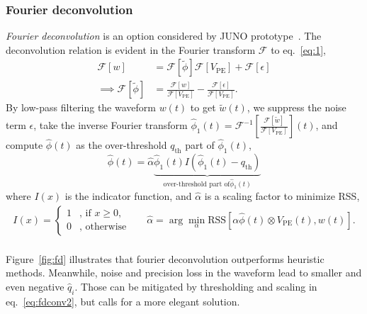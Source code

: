 \subsubsection{Fourier deconvolution}
\textit{Fourier deconvolution} is an option considered by JUNO prototype~\cite{zhang_comparison_2019}. The deconvolution relation is evident in the Fourier transform $\mathcal{F}$ to eq.~\eqref{eq:1},
\begin{equation}
  \label{eq:fourier}
  \begin{aligned}
  \mathcal{F}[w] & = \mathcal{F}[\tilde{\phi}]\mathcal{F}[V_\mathrm{PE}] + \mathcal{F}[\epsilon]\\
  \implies \mathcal{F}[\tilde{\phi}] & = \frac{\mathcal{F}[w]}{\mathcal{F}[V_\mathrm{PE}]} - \frac{\mathcal{F}[\epsilon]}{\mathcal{F}[V_\mathrm{PE}]}.
  \end{aligned}
\end{equation}
By low-pass filtering the waveform $w(t)$ to get $\tilde{w}(t)$, we suppress the noise term $\epsilon$, take the inverse Fourier transform $\hat{\phi}_1(t) = \mathcal{F}^{-1}\left[\frac{\mathcal{F}[\tilde{w}]}{\mathcal{F}[V_\mathrm{PE}]}\right](t)$, and compute $\hat{\phi}(t)$ as the over-threshold $q_\mathrm{th}$ part of $\hat{\phi}_1(t)$,
\begin{equation}
  \label{eq:fdconv2}
    \hat{\phi}(t) = \hat{\alpha}\underbrace{\hat{\phi}_1(t) I(\hat{\phi}_1(t) - q_\mathrm{th})}_{\text{over-threshold part of} \hat{\phi}_1(t)}  
\end{equation}
where $I(x)$ is the indicator function, and $\hat{\alpha}$ is a scaling factor to minimize RSS,
\begin{equation*}
  \begin{aligned}
  \label{eq:id}
  I(x) = \left\{
    \begin{array}{ll}
      1 & \mbox{, if $x\ge0$}, \\
      0 & \mbox{, otherwise}
    \end{array}
    \right.
    \quad~~~
    \hat{\alpha} = \arg \underset{\alpha}{\min}\mathrm{RSS}\left[\alpha\hat{\phi}(t)\otimes V_\mathrm{PE}(t),w(t)\right]. \\
  \end{aligned}
\end{equation*}

Figure~\ref{fig:fd} illustrates that fourier deconvolution outperforms heuristic methods.  Meanwhile, noise and precision loss in the waveform lead to smaller and even negative $\hat{q}_i$. Those can be mitigated by thresholding and scaling in eq.~\eqref{eq:fdconv2}, but calls for a more elegant solution.

